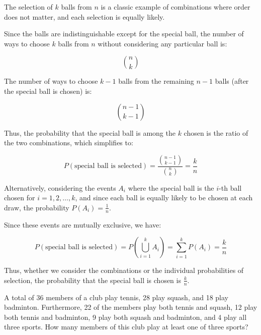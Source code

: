             \begin{solution}
            The selection of \(k\) balls from \(n\) is a classic example of combinations where order does not matter, and each selection is equally likely.
            
            Since the balls are indistinguishable except for the special ball, the number of ways to choose \(k\) balls from \(n\) without considering any particular ball is:
            
            \[
            \binom{n}{k}
            \]
            
            The number of ways to choose \(k-1\) balls from the remaining \(n-1\) balls (after the special ball is chosen) is:
            
            \[
            \binom{n-1}{k-1}
            \]
            
            Thus, the probability that the special ball is among the \(k\) chosen is the ratio of the two combinations, which simplifies to:
            
            \[
            P(\text{special ball is selected}) = \frac{\binom{n-1}{k-1}}{\binom{n}{k}} = \frac{k}{n}
            \]
            
            Alternatively, considering the events \(A_i\) where the special ball is the \(i\)-th ball chosen for \(i = 1, 2, \ldots, k\), and since each ball is equally likely to be chosen at each draw, the probability \(P(A_i) = \frac{1}{n}\).
            
            Since these events are mutually exclusive, we have:
            
            \[
            P(\text{special ball is selected}) = P\left(\bigcup_{i=1}^{k} A_i\right) = \sum_{i=1}^{k} P(A_i) = \frac{k}{n}
            \]
            
            Thus, whether we consider the combinations or the individual probabilities of selection, the probability that the special ball is chosen is \(\frac{k}{n}\).
            \end{solution}


            \begin{example}
                A total of 36 members of a club play tennis, 28 play squash, and 18 play badminton. Furthermore, 22 of the members play both tennis and squash, 12 play both tennis and badminton, 9 play both squash and badminton, and 4 play all three sports. How many members of this club play at least one of three sports?
                \end{example}
                

